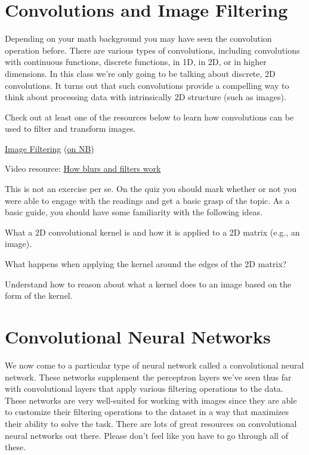 \documentclass[assignment07_Solutions]{subfiles}
\begin{document}
\section{Convolutions and Image Filtering}

Depending on your math background you may have seen the convolution operation before.  There are various types of convolutions, including convolutions with continuous functions, discrete functions, in 1D, in 2D, or in higher dimensions.  In this class we're only going to be talking about discrete, 2D convolutions.  It turns out that such convolutions provide a compelling way to think about processing data with intrinsically 2D structure (such as images).

Check out at least one of the resources below to learn how convolutions can be used to filter and transform images.

\begin{externalresources}[(30 minutes)]
\bi
\item \href{http://machinelearninguru.com/computer_vision/basics/convolution/image_convolution_1.html}{Image Filtering} (\href{http://nb.mit.edu/f/55484}{on NB})
\item Video resource: \href{https://www.youtube.com/watch?v=C_zFhWdM4ic}{How blurs and filters work}
\ei
\end{externalresources}

\begin{exercise}[(10 minutes)]
This is not an exercise per se.  On the quiz you should mark whether or not you were able to engage with the readings and get a basic grasp of the topic.  As a basic guide, you should have some familiarity with the following ideas.
\bi
\item What a 2D convolutional kernel is and how it is applied to a 2D matrix (e.g., an image).
\item What happens when applying the kernel around the edges of the 2D matrix?
\item Understand how to reason about what a kernel does to an image based on the form of the kernel.
\ei
\end{exercise}


\section{Convolutional Neural Networks}
We now come to a particular type of neural network called a convolutional neural network.  These networks supplement the perceptron layers we've seen thus far with convolutional layers that apply various filtering operations to the data.  These networks are very well-suited for working with images since they are able to customize their filtering operations to the dataset in a way that maximizes their ability to solve the task.  There are lots of great resources on convolutional neural networks out there.  Please don't feel like you have to go through all of these.
\end{document}
